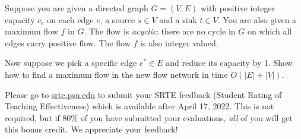\documentclass[11pt]{article}
\begin{document}
\begin{qunlist}
Suppose you are given a directed graph $G=(V,E)$ with positive integer capacity $c_e$ on each edge $e$, a source $s\in V$ and a sink $t \in V$. You are also given a maximum flow $f$ in $G$. The flow is \emph{acyclic}: there are no cycle in $G$ on which all edges carry positive flow. The flow $f$ is also integer valued.

Now suppose we pick a specific edge $e^* \in E$ and reduce its capacity by 1. Show how to find a maximum flow in the new flow network in time $O(|E|+|V|)$. 

Please go to \url{srte.psu.edu} to submit your SRTE feedback (Student Rating of Teaching Effectiveness) which is available after April 17, 2022. This is not required, but if 80\% of you have submitted your evaluations, \emph{all} of you will get this bonus credit. We appreciate your feedback!

\end{qunlist}
\end{document}
